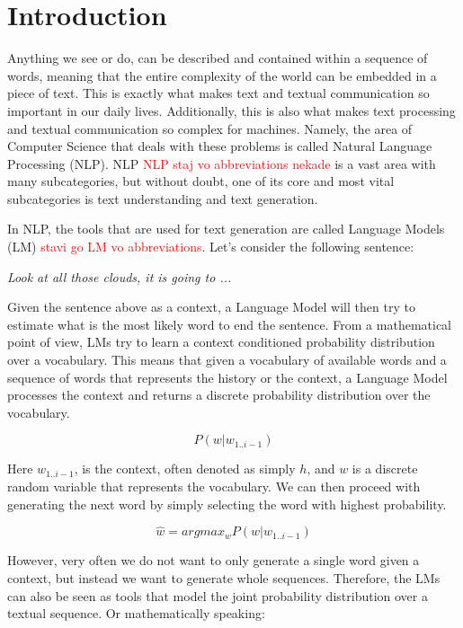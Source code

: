 \chapter{Introduction}
\label{chapter:introduction}

Anything we see or do, can be described and contained within a sequence of words, meaning that the entire complexity of the world can be embedded in a piece of text. This is exactly what makes text and textual communication so important in our daily lives. Additionally, this is also what makes text processing and textual communication so complex for machines. Namely, the area of Computer Science that deals with these problems is called Natural Language Processing (NLP). NLP \textcolor{red}{NLP staj vo abbreviations nekade} is a vast area with many subcategories, but without doubt, one of its core and most vital subcategories is text understanding and text generation.

In NLP, the tools that are used for text generation are called Language Models (LM) \textcolor{red}{stavi go LM vo abbreviations}. Let's consider the following sentence:

\begin{center}
    \emph{Look at all those clouds, it is going to ...}
\end{center}

Given the sentence above as a context, a Language Model will then try to estimate what is the most likely word to end the sentence. From a mathematical point of view, LMs try to learn a context conditioned probability distribution over a vocabulary. This means that given a vocabulary of available words and a sequence of words that represents the history or the context, a Language Model processes the context and returns a discrete probability distribution over the vocabulary. 

\begin{displaymath}
    P(w | w_{1..i-1})
\end{displaymath}

Here $w_{1..i-1}$, is the context, often denoted as simply $ h $, and $ w $ is a discrete random variable that represents the vocabulary. We can then proceed with generating the next word by simply selecting the word with highest probability.

\begin{displaymath}
    \hat{w} = argmax_w P(w | w_{1..i-1})
\end{displaymath}

However, very often we do not want to only generate a single word given a context, but instead we want to generate whole sequences. Therefore, the LMs can also be seen as tools that model the joint probability distribution over a textual sequence. Or mathematically speaking:

